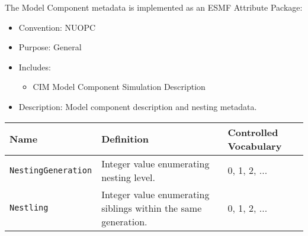 The Model Component metadata is implemented as an ESMF Attribute Package:

\begin{itemize}
    \item Convention: NUOPC
    \item Purpose: General
    \item Includes:
    \begin{itemize}
        \item CIM Model Component Simulation Description 
    \end{itemize} 
    \item Description: Model component description and nesting metadata. 
\end{itemize}

\begin{tabular}{|p{5cm}|p{5cm}|p{35mm}|}
     \hline\hline
     {\bf Name} & {\bf Definition} & {\bf Controlled Vocabulary}\\
     \hline\hline
     {\tt NestingGeneration} & Integer value enumerating nesting level.& 0, 1, 2, ...\\
     {\tt Nestling} & Integer value enumerating siblings within the same generation.& 0, 1, 2, ...\\
     \hline\hline
\end{tabular}
